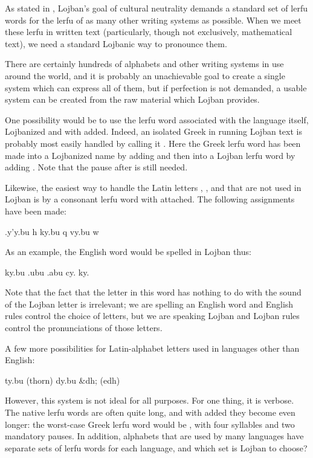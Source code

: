 As stated in , Lojban's goal of
    cultural neutrality demands a standard set of lerfu words for
    the lerfu of as many other writing systems as possible. When we
    meet these lerfu in written text (particularly, though not
    exclusively, mathematical text), we need a standard Lojbanic
    way to pronounce them.

There are certainly hundreds of alphabets and other writing
    systems in use around the world, and it is probably an
    unachievable goal to create a single system which can express
    all of them, but if perfection is not demanded, a usable system
    can be created from the raw material which Lojban provides.

One possibility would be to use the lerfu word associated
    with the language itself, Lojbanized and with  added.
    Indeed, an isolated Greek  in running Lojban text is
    probably most easily handled by calling it . Here
    the Greek lerfu word has been made into a Lojbanized name by
    adding  and then into a Lojban lerfu word by adding
    . Note that the pause after  is still
    needed.

Likewise, the easiest way to handle the Latin letters ,
    , and  that are not used in Lojban is by a consonant
    lerfu word with  attached. The following assignments have
    been made:

   .y'y.bu     h
        ky.bu       q
        vy.bu       w

As an example, the English word  would be spelled in
    Lojban thus:
\begin{example}
ky.bu .ubu .abu cy. ky.\n
{}    
\end{example}

Note that the fact that the letter  in this word has
    nothing to do with the sound of the Lojban letter  is
    irrelevant; we are spelling an English word and English rules
    control the choice of letters, but we are speaking Lojban and
    Lojban rules control the pronunciations of those letters. 

A few more possibilities for Latin-alphabet letters used in
    languages other than English:

   ty.bu       \th(thorn)
        dy.bu       \&dh; (edh)

However, this system is not ideal for all purposes.  For one thing, it is
verbose.  The native lerfu words are often quite long, and with  added
they become even longer: the worst-case Greek lerfu word would be
, with four syllables and two mandatory pauses.  In addition,
alphabets that are used by many languages have separate sets of lerfu words
for each language, and which set is Lojban to choose?

